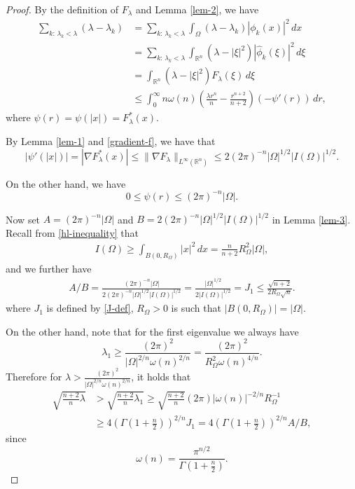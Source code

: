 \documentclass[11pt,twoside, leqno]{article}
\def\rr{{\mathbb R}}
\def\rn{{{\rr}^n}}
\numberwithin{equation}{section}
\begin{document}
\begin{proof}
By the definition of $F_\lambda$ and Lemma \ref{lem-2}, we have
\begin{align}\label{est-1}
\sum_{k:\,\lambda_k<\lambda}(\lambda-\lambda_k)&= \sum_{k:\,\lambda_k<\lambda}\int_{\Omega} (\lambda-\lambda_k)|\phi_k(x)|^2\,dx \nonumber\\
&= \sum_{k:\,\lambda_k<\lambda}\int_{\rn} (\lambda-|\xi|^2)|\hat{\phi}_k(\xi)|^2\,d\xi \nonumber\\
&= \int_{\rn} (\lambda-|\xi|^2) F_\lambda(\xi)\,d\xi\nonumber\\
&\le \int_0^\infty n\omega(n)\left(\frac{\lambda r^n}{n} -\frac{r^{n+2}}{n+2}\right) (-\psi'(r))\,dr,
\end{align}
where $\psi(r)=\psi(|x|)=F_\lambda^\ast(x)$.

By Lemma \ref{lem-1} and \eqref{gradient-f}, we have that
$$|\psi'(|x|)|=|\nabla F_\lambda^\ast(x)|\le \|\nabla F_\lambda\|_{L^\infty(\rn)}\le 2(2\pi)^{-n}|\Omega|^{1/2}|I(\Omega)|^{1/2}.$$

On the other hand, we have
$$0\le \psi(r)\le (2\pi)^{-n} |\Omega|.$$

Now set $A=(2\pi)^{-n} |\Omega|$ and $B=2(2\pi)^{-n}|\Omega|^{1/2}|I(\Omega)|^{1/2}$ in Lemma \ref{lem-3}.
Recall from \eqref{hl-inequality} that
\begin{align*}
I(\Omega)\ge \int_{B(0,R_\Omega)}|x|^2\,dx=\frac{n}{n+2}R_\Omega^2|\Omega|,
\end{align*}
and we further have
\begin{align}\label{J-compare}
A/B=\frac{(2\pi)^{-n} |\Omega|}{2(2\pi)^{-n}|\Omega|^{1/2}|I(\Omega)|^{1/2}}=\frac{|\Omega|^{1/2}}{2|I(\Omega)|^{1/2}}=J_1\le \frac{\sqrt{n+2}}{2R_\Omega\sqrt n}.
\end{align}
where $J_1$ is defined by \eqref{J-def}, $R_\Omega>0$ is such that $|B(0,R_\Omega)|=|\Omega|.$

On the other hand, note that for the first eigenvalue we always have
\begin{equation}\label{first-eigenvalue}
\lambda_1 \ge  \frac{(2\pi)^2}{|\Omega|^{2/n}\omega(n)^{2/n}}=\frac{(2\pi)^2}{R_\Omega^2\omega(n)^{4/n}}.
\end{equation}
Therefore for $\lambda>\frac{(2\pi)^2}{|\Omega|^{2/n}\omega(n)^{2/n}}$, it holds that
\begin{align}\label{first-j1}
\sqrt{\frac{n+2}{n}\lambda}& >\sqrt{\frac{n+2}{n}\lambda_1} \ge \sqrt{\frac{n+2}{n}} (2\pi)  |\omega(n)|^{-2/n} R_\Omega^{-1}\nonumber\\
&\ge 4(\Gamma(1+\frac n2))^{2/n}J_1=4(\Gamma(1+\frac n2))^{2/n} A/B,
\end{align}
since
$$\omega(n)=\frac{\pi^{n/2}}{\Gamma(1+\frac n2)}.$$



\end{proof}
\end{document}
